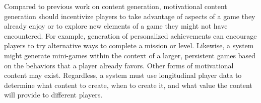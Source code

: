 \documentclass[conference]{IEEEtran}
\begin{document}
Compared to previous work on content generation, motivational content generation should incentivize players to take advantage of aspects of a game they already enjoy or to explore new elements of a game they might not have encountered.
For example, generation of personalized achievements can encourage players to try alternative ways to complete a mission or level.  
Likewise, a system might generate mini-games within the context of a larger, persistent games based on the behaviors that a player already favors.   
Other forms of motivational content may exist. 
Regardless, a system must use longitudinal player data to determine what content to create, when to create it, and what value the content will provide to different players. 
\end{document}
